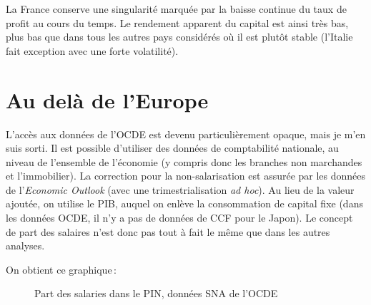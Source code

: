 \documentclass[
  french,
  9pt,
  a4paper,
]{article}
\begin{document}
La France conserve une singularité marquée par la baisse continue du
taux de profit au cours du temps. Le rendement apparent du capital est
ainsi très bas, plus bas que dans tous les autres pays considérés où il
est plutôt stable (l'Italie fait exception avec une forte volatilité).

\section{Au delà de l'Europe}\label{au-deluxe0-de-leurope}

L'accès aux données de l'OCDE est devenu particulièrement opaque, mais
je m'en suis sorti. Il est possible d'utiliser des données de
comptabilité nationale, au niveau de l'ensemble de l'économie (y compris
donc les branches non marchandes et l'immobilier). La correction pour la
non-salarisation est assurée par les données de l'\emph{Economic
Outlook} (avec une trimestrialisation \emph{ad hoc}). Au lieu de la
valeur ajoutée, on utilise le PIB, auquel on enlève la consommation de
capital fixe (dans les données OCDE, il n'y a pas de données de CCF pour
le Japon). Le concept de part des salaires n'est donc pas tout à fait le
même que dans les autres analyses.

On obtient ce graphique\,:

\begin{figure}[H]

\caption{\label{fig-psaloecd}Part des salaries dans le PIN, données SNA
de l'OCDE}


\end{figure}%
\end{document}

